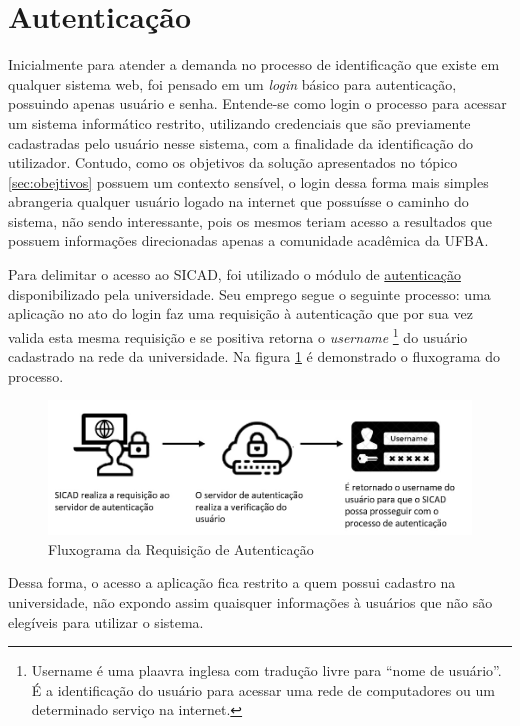 \documentclass[12pt, a4paper]{report}
\begin{document}
\section{Autenticação}
Inicialmente para atender a demanda no processo de identificação que existe em qualquer sistema web, foi pensado em um \textit{login} básico para autenticação, possuindo apenas usuário e senha. Entende-se como login o processo para acessar um sistema informático restrito, utilizando credenciais que são previamente cadastradas pelo usuário nesse sistema, com a finalidade da identificação do utilizador. Contudo, como os objetivos da solução apresentados no tópico \ref{sec:obejtivos} possuem um contexto sensível, o login dessa forma mais simples abrangeria qualquer usuário logado na internet que possuísse o caminho do sistema, não sendo interessante, pois os mesmos teriam acesso a resultados que possuem informações direcionadas apenas a comunidade acadêmica da UFBA.

Para delimitar o acesso ao \ac{SICAD}, foi utilizado o módulo de \href{https://www.autenticacao.ufba.br}{autenticação} disponibilizado pela universidade. Seu emprego segue o seguinte processo: uma aplicação no ato do login faz uma requisição à autenticação que por sua vez valida esta mesma requisição e se positiva retorna o \textit{username} \footnote{Username é uma plaavra inglesa com tradução livre para “nome de usuário”. É a identificação do usuário para acessar uma rede de computadores ou um determinado serviço na internet.} do usuário cadastrado na rede da universidade. Na figura \ref{fig:processo_autenticacao} é demonstrado o fluxograma do processo.

\begin{figure}
\centering
\includegraphics[scale=0.50]{processo_autenticacao.jpg}
\caption{Fluxograma da Requisição de Autenticação}
\label{fig:processo_autenticacao}
\end{figure}

Dessa forma, o acesso a aplicação fica restrito a quem possui cadastro na universidade, não expondo assim quaisquer informações à usuários que não são elegíveis para utilizar o sistema.
\end{document}
